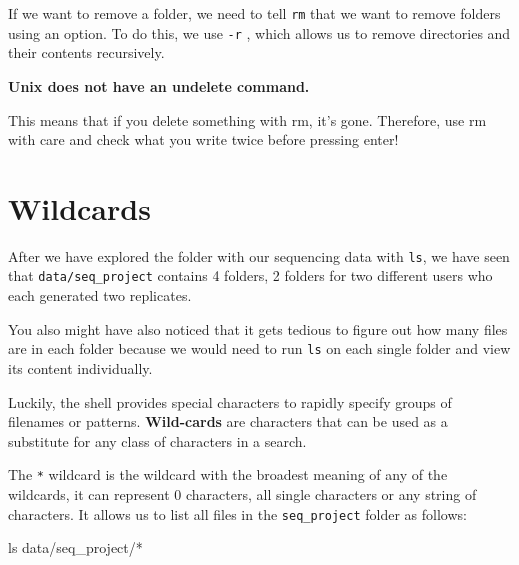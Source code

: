\documentclass[
  letterpaper,
  DIV=11,
  numbers=noendperiod]{scrreprt}
\newenvironment{Shaded}{}{}
\newcommand{\FunctionTok}[1]{\textcolor[rgb]{0.44,0.26,0.76}{#1}}
\newcommand{\NormalTok}[1]{\textcolor[rgb]{0.14,0.16,0.18}{#1}}
\newcommand{\PreprocessorTok}[1]{\textcolor[rgb]{0.84,0.23,0.29}{#1}}
\begin{document}
If we want to remove a folder, we need to tell \texttt{rm} that we want
to remove folders using an option. To do this, we use \texttt{-r} ,
which allows us to remove directories and their contents recursively.

\begin{tcolorbox}[enhanced jigsaw, bottomtitle=1mm, colframe=quarto-callout-important-color-frame, left=2mm, leftrule=.75mm, coltitle=black, colbacktitle=quarto-callout-important-color!10!white, toprule=.15mm, rightrule=.15mm, opacityback=0, titlerule=0mm, colback=white, breakable, bottomrule=.15mm, title=\textcolor{quarto-callout-important-color}{\faExclamation}\hspace{0.5em}{Important}, arc=.35mm, toptitle=1mm, opacitybacktitle=0.6]

\textbf{Unix does not have an undelete command.}

This means that if you delete something with rm, it's gone. Therefore,
use rm with care and check what you write twice before pressing enter!

\end{tcolorbox}

\section{Wildcards}\label{wildcards}

After we have explored the folder with our sequencing data with
\texttt{ls}, we have seen that \texttt{data/seq\_project} contains 4
folders, 2 folders for two different users who each generated two
replicates.

You also might have also noticed that it gets tedious to figure out how
many files are in each folder because we would need to run \texttt{ls}
on each single folder and view its content individually.

Luckily, the shell provides special characters to rapidly specify groups
of filenames or patterns. \textbf{Wild-cards} are characters that can be
used as a substitute for any class of characters in a search.

The \texttt{*} wildcard is the wildcard with the broadest meaning of any
of the wildcards, it can represent 0 characters, all single characters
or any string of characters. It allows us to list all files in the
\texttt{seq\_project} folder as follows:

\begin{Shaded}
\begin{Highlighting}[]
\FunctionTok{ls}\NormalTok{ data/seq\_project/}\PreprocessorTok{*}
\end{Highlighting}
\end{Shaded}
\end{document}
